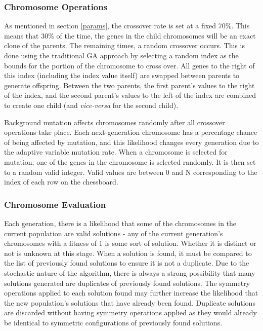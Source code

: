 \documentclass{sig-alternate}
\begin{document}
\subsubsection{Chromosome Operations}
As mentioned in section \ref{params}, the crossover rate is set at a fixed 70\%. This means that 30\% of the time, the genes in the child chromosomes will be an exact clone of the parents. The remaining times, a random crossover occurs. This is done using the traditional GA approach by selecting a random index as the bounds for the portion of the chromosome to cross over. All genes to the right of this index (including the index value itself) are swapped between parents to generate offspring. Between the two parents, the first parent's values to the right of the index, and the second parent's values to the left of the index are combined to create one child (and \textit{vice-versa} for the second child).

Background mutation affects chromosomes randomly after all crossover operations take place. Each next-generation chromosome has a percentage chance of being affected by mutation, and this likelihood changes every generation due to the adaptive variable mutation rate. When a chromosome is selected for mutation, one of the genes in the chromosome is selected randomly. It is then set to a random valid integer. Valid values are between 0 and N corresponding to the index of each row on the chessboard.


\subsubsection{Chromosome Evaluation}
Each generation, there is a likelihood that some of the chromosomes in the current population are valid solutions - any of the current generation's chromosomes with a fitness of 1 is some sort of solution. Whether it is distinct or not is unknown at this stage. When a solution is found, it must be compared to the list of previously found solutions to ensure it is not a duplicate. Due to the stochastic nature of the algorithm, there is always a strong possibility that many solutions generated are duplicates of previously found solutions. The symmetry operations applied to each solution found may further increase the likelihood that the new population's solutions that have already been found. Duplicate solutions are discarded without having symmetry operations applied as they would already be identical to symmetric configurations of previously found solutions.
\end{document}
